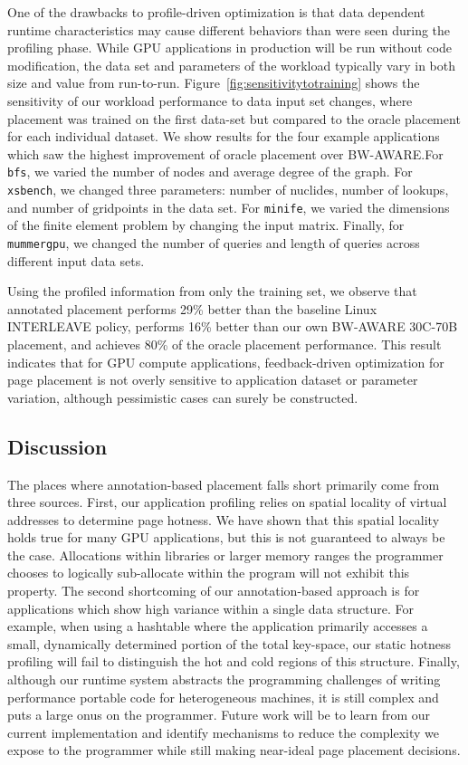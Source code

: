 One of the drawbacks to profile-driven optimization is that data dependent
runtime characteristics may cause different behaviors than were seen during
the profiling phase. While GPU applications in production will be run without code
modification, the data set and parameters of the workload typically vary in both
size and value from run-to-run.
Figure~\ref{fig:sensitivitytotraining} shows the sensitivity of our workload performance to
data input set changes, where placement was trained on the first data-set but
compared to the oracle placement for each individual dataset.
We show results for the four example applications which saw the highest improvement
of oracle placement over BW-AWARE.\@ For {\tt bfs}, we varied the number 
of nodes and average degree of the graph.
For {\tt xsbench}, we changed three parameters: number of nuclides, number of
lookups, and number of gridpoints in the data set. For {\tt minife}, we varied
the dimensions of the finite element problem by changing the input matrix.
Finally, for {\tt mummergpu}, we changed the number of queries and length of
queries across different input data sets.

Using the profiled information from only the training set, we observe that annotated
placement performs 29\% better than the baseline Linux INTERLEAVE policy,
performs 16\% better than our 
own BW-AWARE 30C-70B placement, and achieves 80\% of the oracle placement performance.  This 
result indicates that for GPU compute applications, feedback-driven optimization for page placement
is not overly sensitive to application dataset or parameter variation, although pessimistic
cases can surely be constructed.


\subsection{Discussion}
\vspace{-0.05in}
The places where annotation-based placement falls short primarily come from
three sources.  First, our application profiling relies on spatial locality of virtual addresses 
to determine page hotness.  We have shown that this spatial locality holds true
for many GPU applications, but this is not guaranteed to always be the case. Allocations within 
libraries or larger memory ranges the programmer chooses
to logically sub-allocate within the program will not exhibit this property. 
The second shortcoming of our annotation-based approach is for applications 
which show high variance within a single data structure.  {\color{black}For example, when using a hashtable 
where the application primarily accesses a small, dynamically determined portion of the total key-space,
our static hotness profiling will fail to distinguish the hot and cold regions of this structure}.  Finally,
although our runtime system abstracts the programming challenges of writing
performance portable code for heterogeneous machines, it is still complex and puts
a large onus on the programmer.  Future work will be to learn from our current
implementation and identify mechanisms to reduce the complexity we expose to the programmer
while still making near-ideal page placement decisions.

